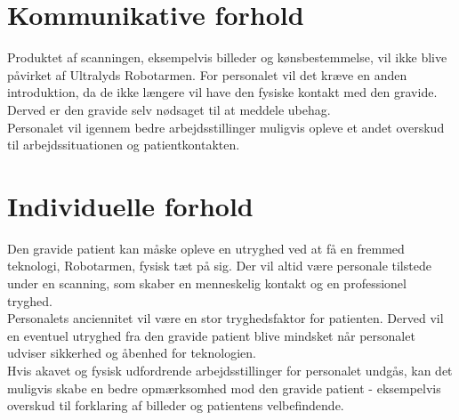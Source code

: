 \section{Kommunikative forhold}
Produktet af scanningen, eksempelvis billeder og kønsbestemmelse, vil ikke blive påvirket af Ultralyds Robotarmen.
For personalet vil det kræve en anden introduktion, da de ikke længere vil have den fysiske kontakt med den gravide. Derved er den gravide selv nødsaget til at meddele ubehag.  \\
Personalet vil igennem bedre arbejdsstillinger muligvis opleve et andet overskud til arbejdssituationen og patientkontakten.  

\section{Individuelle forhold}
Den gravide patient kan måske opleve en utryghed ved at få en fremmed teknologi, Robotarmen, fysisk tæt på sig. Der vil altid være personale tilstede under en scanning, som skaber en menneskelig kontakt og en professionel tryghed.  \\
Personalets anciennitet vil være en stor tryghedsfaktor for patienten. Derved vil en eventuel utryghed fra den gravide patient blive mindsket når personalet udviser sikkerhed og åbenhed for teknologien.\\  
Hvis akavet og fysisk udfordrende arbejdsstillinger for personalet undgås, kan det muligvis skabe en bedre opmærksomhed mod den gravide patient - eksempelvis overskud til forklaring af billeder og patientens velbefindende.  


